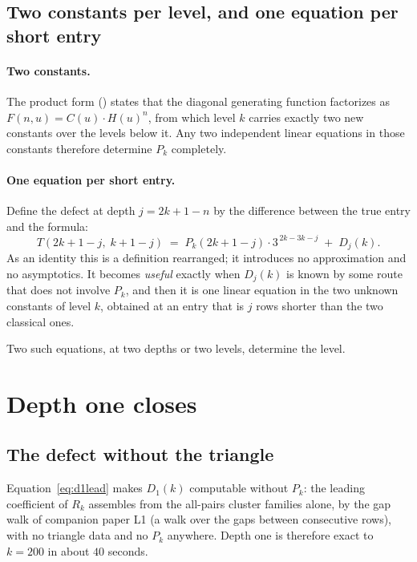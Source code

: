 \documentclass[11pt]{article}
\newcommand{\Dj}{D_j}
\begin{document}
\subsection{Two constants per level, and one equation per short entry}
\label{sec:pin}

\paragraph{Two constants.} The product form
() states that the diagonal generating function
factorizes as $F(n,u) = C(u)\cdot H(u)^n$, from which level $k$ carries exactly
two new constants over the levels below it. Any two independent linear
equations in those constants therefore determine $P_k$ completely.

\paragraph{One equation per short entry.} Define the defect at depth
$j = 2k+1-n$ by the difference between the true entry and the formula:
\begin{equation}\label{eq:pin}
  T(2k+1-j,\; k+1-j) \;=\; P_k(2k+1-j)\cdot 3^{\,2k-3k-j} \;+\; \Dj(k).
\end{equation}
As an identity this is a definition rearranged; it introduces no approximation
and no asymptotics. It becomes \emph{useful} exactly when $\Dj(k)$ is known by
some route that does not involve $P_k$, and then it is one linear equation in
the two unknown constants of level $k$, obtained at an entry that is $j$ rows
shorter than the two classical ones.

Two such equations, at two depths or two levels, determine the level.

\section{Depth one closes}
\label{sec:depth1}

\subsection{The defect without the triangle}

Equation~\eqref{eq:d1lead} makes $D_1(k)$ computable without $P_k$: the
leading coefficient of $R_k$ assembles from the all-pairs cluster families
alone, by the gap walk of companion paper L1 (a walk over the gaps between
consecutive rows), with no triangle data and no $P_k$ anywhere. Depth one is
therefore exact to $k = 200$ in about $40$ seconds.
\end{document}
